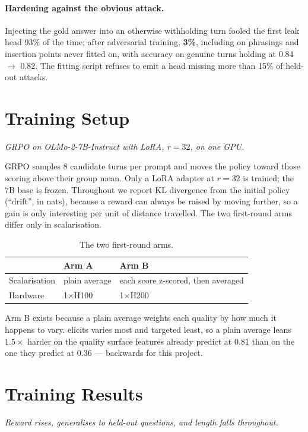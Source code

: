 \documentclass[11pt]{article}
\newcommand{\qual}[1]{\textsf{#1}}
\newcommand{\claim}[1]{\vspace{-7pt}\par{\small\itshape #1}\par\vspace{3pt}}
\begin{document}
\paragraph{Hardening against the obvious attack.} Injecting the gold answer into an otherwise
withholding turn fooled the first leak head 93\% of the time; after adversarial training, \textbf{3\%},
including on phrasings and insertion points never fitted on, with accuracy on genuine turns holding at
0.84 $\rightarrow$ 0.82. The fitting script refuses to emit a head missing more than 15\% of held-out
attacks.

\section{Training Setup}
\label{sec:setup}
\claim{GRPO on OLMo-2-7B-Instruct with LoRA, $r=32$, on one GPU.}

GRPO samples 8 candidate turns per prompt and moves the policy toward those scoring above their group
mean. Only a LoRA adapter at $r=32$ is trained; the 7B base is frozen. Throughout we report KL
divergence from the initial policy (``drift'', in nats), because a reward can always be raised by
moving further, so a gain is only interesting per unit of distance travelled. The two first-round arms
differ only in scalarisation.

\begin{table}[h]
\centering
\begin{tabular}{lll}
\toprule
& \textbf{Arm A} & \textbf{Arm B} \\
\midrule
Scalarisation & plain average & each score z-scored, then averaged \\
Hardware & 1$\times$H100 & 1$\times$H200 \\
\bottomrule
\end{tabular}
\caption{The two first-round arms.}
\label{tab:arms}
\end{table}

Arm B exists because a plain average weights each quality by how much it happens to vary.
\qual{elicits} varies most and \qual{targeted} least, so a plain average leans $1.5\times$ harder on
the quality surface features already predict at 0.81 than on the one they predict at 0.36 --- backwards
for this project.

\section{Training Results}
\label{sec:training}
\claim{Reward rises, generalises to held-out questions, and length falls throughout.}
\end{document}
